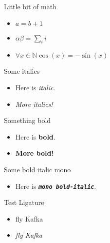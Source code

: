 \documentclass{beamer}
\begin{document}
\begin{frame}
    \begin{block}{Little bit of math}
        \begin{itemize}
            \item $a = b + 1$
            \item $\alpha \beta = \sum_i i$
            \item $\forall x \in \mathbb{N}\cos(x) = -\sin(x)$
        \end{itemize}
    \end{block}
\end{frame}

\begin{frame}
    \begin{block}{Some italics}
        \begin{itemize}
            \item Here is \textit{italic}. 
            \item \textit{More italics!}
        \end{itemize}
    \end{block}

    \begin{block}{Something bold}
        \begin{itemize}
            \item Here is \textbf{bold}. 
            \item \textbf{More bold!}
        \end{itemize}
    \end{block}
    
    \begin{block}{Some bold italic mono}
        \begin{itemize}
            \item Here is \texttt{\textit{\textbf{mono bold-italic}}}. 
        \end{itemize}
    \end{block}
\end{frame}

\begin{frame}
    \begin{block}{Test Ligature}
        \begin{itemize}
            \item fly Kafka
            \item \textit{fly Kafka}
        \end{itemize}
    \end{block}
\end{frame}
\end{document}
